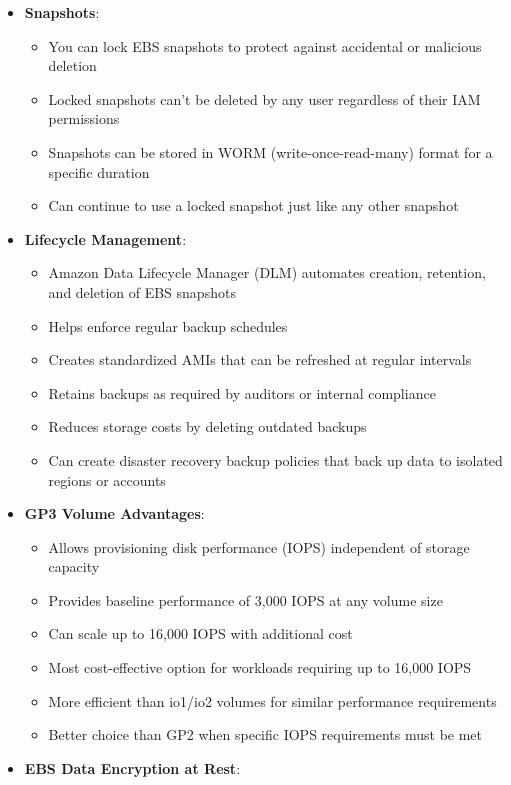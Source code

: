 \documentclass[11pt,a4paper]{report}
\begin{document}
\begin{itemize}
\begin{itemize}
\end{itemize}
  \item \textbf{Snapshots}:
\begin{itemize}
  \item You can lock EBS snapshots to protect against accidental or malicious deletion
  \item Locked snapshots can't be deleted by any user regardless of their IAM permissions
  \item Snapshots can be stored in WORM (write-once-read-many) format for a specific duration
  \item Can continue to use a locked snapshot just like any other snapshot
\end{itemize}
  \item \textbf{Lifecycle Management}:
\begin{itemize}
  \item Amazon Data Lifecycle Manager (DLM) automates creation, retention, and deletion of EBS snapshots
  \item Helps enforce regular backup schedules
  \item Creates standardized AMIs that can be refreshed at regular intervals
  \item Retains backups as required by auditors or internal compliance
  \item Reduces storage costs by deleting outdated backups
  \item Can create disaster recovery backup policies that back up data to isolated regions or accounts
\end{itemize}
  \item \textbf{GP3 Volume Advantages}:
\begin{itemize}
  \item Allows provisioning disk performance (IOPS) independent of storage capacity
  \item Provides baseline performance of 3,000 IOPS at any volume size
  \item Can scale up to 16,000 IOPS with additional cost
  \item Most cost-effective option for workloads requiring up to 16,000 IOPS
  \item More efficient than io1/io2 volumes for similar performance requirements
  \item Better choice than GP2 when specific IOPS requirements must be met
\end{itemize}
  \item \textbf{EBS Data Encryption at Rest}:
\begin{itemize}

\end{itemize}
\end{itemize}
\end{document}
